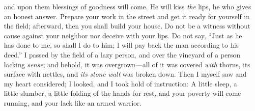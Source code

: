 \begin{biblechapter}
and upon them blessings of goodness will come.
\verse He will kiss \textit{the} lips, 
he who gives an honest answer.
\verse Prepare your work in the street and get it ready for yourself in the field; 
afterward, then you shall build your house.
\verse Do not be a witness without cause against your neighbor 
nor deceive with your lips.
\verse Do not say, “Just as he has done to me, so shall I do to him; 
I will pay back the man according to his deed.”
\verse I passed by the field of a lazy person, 
and over the vineyard of a person lacking \textit{sense};
\verse and behold, it was overgrown—all of it was covered \textit{with} thorns, its surface with nettles, 
and \textit{its stone wall} was broken down.
\verse Then I myself saw and my heart considered; 
I looked, and I took hold of instruction:
\verse A little sleep, a little slumber, 
a little folding of the hands for rest,
\verse and your poverty will come running, 
and your lack like an armed warrior.
\end{biblechapter}

